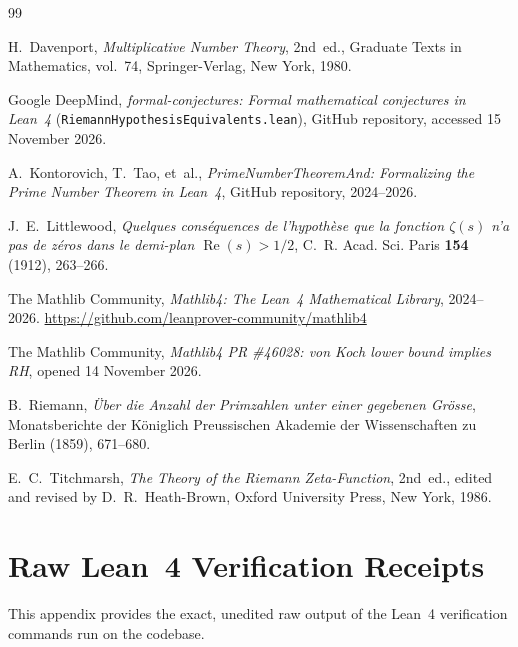 \documentclass[11pt,a4paper]{article}
\theoremstyle{definition}
\begin{document}
\begin{thebibliography}{99}

H.~Davenport, \emph{Multiplicative Number Theory}, 2nd~ed., Graduate Texts in Mathematics, vol.~74, Springer-Verlag, New York, 1980.

Google DeepMind, \emph{formal-conjectures: Formal mathematical conjectures in Lean~4} (\texttt{RiemannHypothesisEquivalents.lean}), GitHub repository, accessed 15 November 2026.

A.~Kontorovich, T.~Tao, et~al., \emph{PrimeNumberTheoremAnd: Formalizing the Prime Number Theorem in Lean~4}, GitHub repository, 2024--2026.

J.~E.~Littlewood, \emph{Quelques cons\'equences de l'hypoth\`ese que la fonction $\zeta(s)$ n'a pas de z\'eros dans le demi-plan $\operatorname{Re}(s) > 1/2$}, C.~R. Acad. Sci. Paris \textbf{154} (1912), 263--266.

The Mathlib Community, \emph{Mathlib4: The Lean~4 Mathematical Library}, 2024--2026. \url{https://github.com/leanprover-community/mathlib4}

The Mathlib Community, \emph{Mathlib4 PR \#46028: von Koch lower bound implies RH}, opened 14 November 2026.

B.~Riemann, \emph{\"Uber die Anzahl der Primzahlen unter einer gegebenen Gr\"osse}, Monatsberichte der K\"oniglich Preussischen Akademie der Wissenschaften zu Berlin (1859), 671--680.

E.~C.~Titchmarsh, \emph{The Theory of the Riemann Zeta-Function}, 2nd~ed., edited and revised by D.~R.~Heath-Brown, Oxford University Press, New York, 1986.

\end{thebibliography}

\appendix
\section{Raw Lean~4 Verification Receipts}
\label{sec:raw_receipts}

This appendix provides the exact, unedited raw output of the Lean~4 verification commands run on the codebase.
\end{document}
